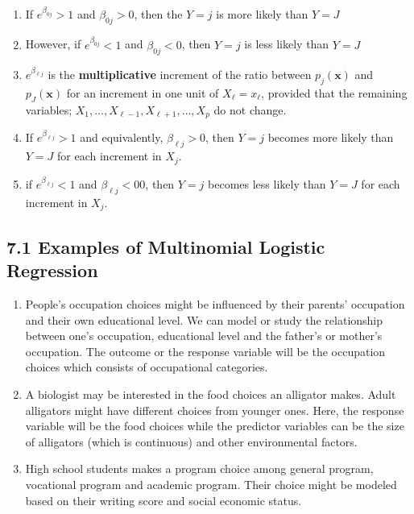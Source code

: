 \documentclass[
]{article}
\begin{document}
\begin{enumerate}
\def\labelenumi{\arabic{enumi}.}
\item
  If \(e^{\beta_{0j}}>1\) and \(\beta_{0j}>0\), then the \(Y=j\) is more
  likely than \(Y=J\)
\item
  However, if \(e^{\beta_{0j}}<1\) and \(\beta_{0j}<0\), then \(Y=j\) is
  less likely than \(Y=J\)
\item
  \(e^{\beta_{\ell j}}\) is the \textbf{multiplicative} increment of the
  ratio between \(p_j(\mathbf{x})\) and \(p_J(\mathbf{x})\) for an
  increment in one unit of \(X_\ell=x_\ell\), provided that the
  remaining variables; \(X_1,\dots,X_{\ell-1},X_{\ell+1},\dots,X_p\) do
  not change.
\item
  If \(e^{\beta_{\ell j}}>1\) and equivalently, \(\beta_{\ell j}>0\),
  then \(Y=j\) becomes more likely than \(Y=J\) for each increment in
  \(X_j\).
\item
  if \(e^{\beta_{\ell j}}<1\) and \(\beta_{\ell j}<00\), then \(Y=j\)
  becomes less likely than \(Y=J\) for each increment in \(X_j\).
\end{enumerate}

\hypertarget{examples-of-multinomial-logistic-regression}{%
\subsection{7.1 Examples of Multinomial Logistic
Regression}\label{examples-of-multinomial-logistic-regression}}

\begin{enumerate}
\def\labelenumi{\arabic{enumi}.}
\item
  People's occupation choices might be influenced by their parents'
  occupation and their own educational level. We can model or study the
  relationship between one's occupation, educational level and the
  father's or mother's occupation. The outcome or the response variable
  will be the occupation choices which consists of occupational
  categories.
\item
  A biologist may be interested in the food choices an alligator makes.
  Adult alligators might have different choices from younger ones. Here,
  the response variable will be the food choices while the predictor
  variables can be the size of alligators (which is continuous) and
  other environmental factors.
\item
  High school students makes a program choice among general program,
  vocational program and academic program. Their choice might be modeled
  based on their writing score and social economic status.
\end{enumerate}
\end{document}

